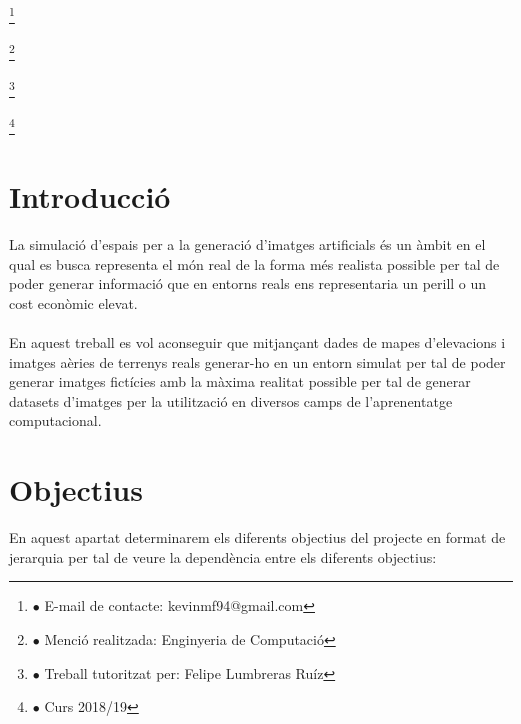\documentclass[10pt,a4paper,twocolumn,twoside]{article}
\newcommand\blfootnote[1]{%
  \begingroup
  \renewcommand\thefootnote{}\footnote{#1}%
  \addtocounter{footnote}{-1}%
  \endgroup
}
\begin{document}
\blfootnote{$\bullet$ E-mail de contacte: kevinmf94@gmail.com}
\blfootnote{$\bullet$ Menció realitzada: Enginyeria de Computació}
\blfootnote{$\bullet$ Treball tutoritzat per: Felipe Lumbreras Ruíz}
\blfootnote{$\bullet$ Curs 2018/19}

\vspace{-1cm}
\section{Introducció}
La simulació d'espais per a la generació d'imatges artificials és un àmbit en el qual es busca representa el món real de la forma més realista possible per tal de poder generar informació que en entorns reals ens representaria un perill o un cost econòmic elevat.
\\
\\
En aquest treball es vol aconseguir que mitjançant dades de mapes d'elevacions i imatges aèries de terrenys reals generar-ho en un entorn simulat per tal de poder generar imatges fictícies amb la màxima realitat possible per tal de generar datasets d'imatges per la utilització en diversos camps de l'aprenentatge computacional.

\section{Objectius}

En aquest apartat determinarem els diferents objectius del projecte en format de jerarquia per tal de veure la dependència entre els diferents objectius:
\end{document}
